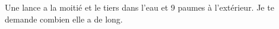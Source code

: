 Une lance a la moitié et le tiers dans l'eau et 9 paumes à l'extérieur. Je te demande combien elle a de long.